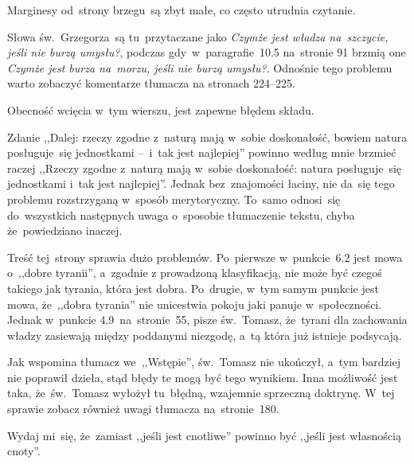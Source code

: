 \documentclass[a4paper,11pt]{article}
\begin{document}
\start Marginesy od~strony brzegu~są zbyt małe, co często utrudnia
czytanie.

\vspace{\spaceFour}


\start {} Słowa św.~Grzegorza~są tu~przytaczane jako
\emph{Czymże jest władza na~szczycie, jeśli nie burzą umysłu?},
podczas gdy~w~paragrafie~10.5 na~stronie 91 brzmią one \emph{Czymże
  jest burza na~morzu, jeśli nie burzą umysłu?}. Odnośnie tego
problemu warto zobaczyć komentarze tłumacza na stronach 224--225.

\vspace{\spaceFour}


\start {} Obecność wcięcia w~tym wierszu, jest zapewne
błędem składu.

\vspace{\spaceFour}


\start {} Zdanie ,,Dalej: rzeczy zgodne z~naturą mają
w~sobie doskonałość, bowiem natura posługuje~się jednostkami --~i~tak
jest najlepiej'' powinno według mnie brzmieć raczej ,,Rzeczy zgodne
z~naturą mają w~sobie doskonałość: natura posługuje~się jednostkami
i~tak jest najlepiej''. Jednak bez~znajomości łaciny, nie da~się tego
problemu rozstrzyganą w~sposób merytoryczny. To~samo odnosi~się
do~wszystkich następnych uwaga o~sposobie tłumaczenie tekstu, chyba
że~powiedziano inaczej.

\vspace{\spaceFour}


\start {} Treść tej~strony sprawia dużo problemów. Po~pierwsze
w~punkcie~6.2 jest mowa o~,,dobre tyranii'', a~zgodnie z prowadzoną
klasyfikacją, nie może być czegoś takiego jak tyrania, która jest
dobra. Po~drugie, w~tym samym punkcie jest mowa, że~,,dobra tyrania''
nie unicestwia pokoju jaki panuje w~społeczności. Jednak w~punkcie
4.9~na~stronie~55, pisze św.~Tomasz, że~tyrani dla zachowania władzy
zasiewają między poddanymi niezgodę, a~tą która już istnieje
podsycają.

Jak wspomina tłumacz we~,,Wstępie'', św.~Tomasz nie ukończył, a~tym
bardziej nie poprawił dzieła, stąd błędy te mogą być tego wynikiem.
Inna możliwość jest taka, że~św.~Tomasz wyłożył tu~błędną, wzajemnie
sprzeczną doktrynę. W~tej sprawie zobacz również uwagi tłumacza
na~stronie~180.

\vspace{\spaceFour}


\start {} Wydaj mi~się, że~zamiast ,,jeśli jest cnotliwe''
powinno być ,,jeśli jest własnością cnoty''.
\end{document}
